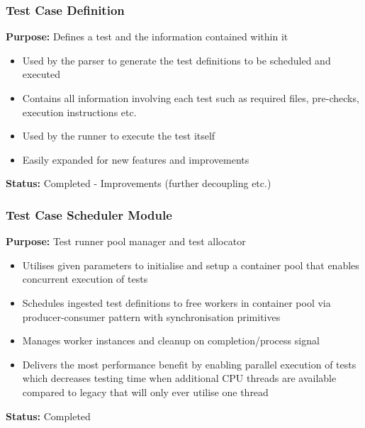 \documentclass[xcolor, handout]{beamer}
\begin{document}
\begin{frame}
	\frametitle{Test Case Definition}
	\textbf{Purpose:} Defines a test and the information contained within it\\
	\begin{itemize}
		\item Used by the parser to generate the test definitions to be scheduled and executed
			\pause
		\item Contains all information involving each test such as required files, pre-checks, execution instructions etc.
			\pause
		\item Used by the runner to execute the test itself
			\pause
		\item Easily expanded for new features and improvements
			\pause
	\end{itemize}
	\textbf{Status:} Completed - Improvements (further decoupling etc.)
\end{frame}

\begin{frame}
	\frametitle{Test Case Scheduler Module}
	\textbf{Purpose:} Test runner pool manager and test allocator\\
	\begin{itemize}
		\item Utilises given parameters to initialise and setup a container pool that enables concurrent execution of tests
			\pause
		\item Schedules ingested test definitions to free workers in container pool via producer-consumer pattern with synchronisation primitives
			\pause
		\item Manages worker instances and cleanup on completion/process signal
			\pause
		\item Delivers the most performance benefit by enabling parallel execution of tests which decreases testing time when additional CPU threads are available compared to legacy that will only ever utilise one thread
			\pause
	\end{itemize}
	\textbf{Status:} Completed
\end{frame}
\end{document}
